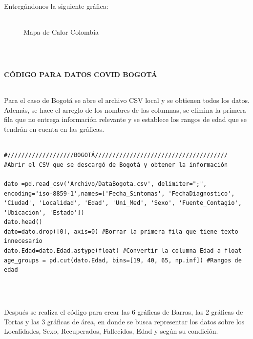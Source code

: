 \documentclass[conference,compsoc,onecolumn]{IEEEtran}
\begin{document}
Entregándonos la siguiente gráfica:
\\\

\begin{figure}[htbp]
\centering
{}
\caption{ Mapa de Calor Colombia} \label{fig:lego}
\end{figure}
\\\

\textbf{CÓDIGO PARA DATOS COVID BOGOTÁ}
\\\

Para el caso de Bogotá  se abre el archivo CSV local y se obtienen todos los datos. Además, se hace el arreglo de los nombres de las columnas, se elimina la primera fila que no entrega información relevante y se establece los rangos de edad que se tendrán en cuenta en las gráficas.
\\\

\begin{lstlisting}
#///////////////////BOGOTÁ//////////////////////////////////////
#Abrir el CSV que se descargó de Bogotá y obtener la información

dato =pd.read_csv('Archivo/DataBogota.csv', delimiter=";", encoding='iso-8859-1',names=['Fecha_Sintomas', 'FechaDiagnostico', 'Ciudad', 'Localidad', 'Edad', 'Uni_Med', 'Sexo', 'Fuente_Contagio', 'Ubicacion', 'Estado'])
dato.head()
dato=dato.drop([0], axis=0) #Borrar la primera fila que tiene texto innecesario
dato.Edad=dato.Edad.astype(float) #Convertir la columna Edad a float
age_groups = pd.cut(dato.Edad, bins=[19, 40, 65, np.inf]) #Rangos de edad
\end{lstlisting}
\\\

Después se realiza el código para crear las 6 gráficas de Barras, las 2 gráficas de Tortas y las 3 gráficas de área, en donde se busca representar los datos sobre los Localidades, Sexo, Recuperados, Fallecidos, Edad y según su condición.
\\\
\end{document}
